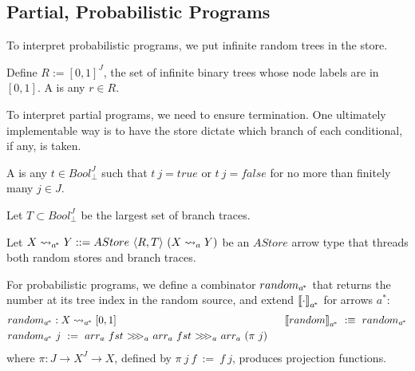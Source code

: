 \documentclass{llncs}
\newcommand{\arrow}{\rightsquigarrow}
\newcommand{\acomp}{\ensuremath{{>}\mspace{-6mu}{>}\mspace{-6mu}{>}}}
\newcommand{\gen}{_a}
\newcommand{\genc}{_{a^{\mspace{-2mu}*}}}
\begin{document}
\subsection{Partial, Probabilistic Programs}
\label{sec:probabilistic-programs}

To interpret probabilistic programs, we put infinite random trees in the store.

\begin{definition}
Define $R := [0,1]^J$, the set of infinite binary trees whose node labels are in $[0,1]$.
A  is any $r \in R$.
\end{definition}

To interpret partial programs, we need to ensure termination.
One ultimately implementable way is to have the store dictate which branch of each conditional, if any, is taken.

\begin{definition}
A  is any $t \in Bool_\bot^J$ such that $t~j = true$ or $t~j = false$ for no more than finitely many $j \in J$.

Let $T \subset Bool_\bot^J$ be the largest set of branch traces.
\end{definition}

Let $X \arrow\genc Y ::= AStore~\pair{R,T}~(X \arrow\gen Y)$ be an $AStore$ arrow type that threads both random stores and branch traces.

For probabilistic programs, we define a combinator $random\genc$ that returns the number at its tree index in the random source, and extend $\meaningof{\cdot}\genc$ for arrows $a^*$:
\begin{equation}
\begin{aligned}
	&\begin{aligned}[t]
		&random\genc : X \arrow\genc [0,1] \\
		&random\genc~j \ := \ arr\gen~fst~\acomp\gen~arr\gen~fst~\acomp\gen~arr\gen~(\pi~j)
	\end{aligned}
&\ \ 
	\meaningof{random}\genc \ :\equiv \ random\genc
\end{aligned}
\label{eqn:random-def}
\end{equation}
where $\pi : J \to X^J \to X$, defined by $\pi~j~f \ := \ f~j$, produces projection functions.
\end{document}
